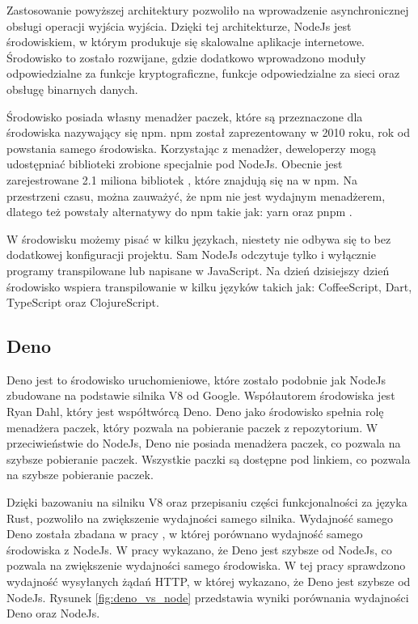 Zastosowanie powyższej architektury pozwoliło na wprowadzenie asynchronicznej obsługi operacji wyjścia wyjścia. Dzięki tej architekturze, NodeJs jest środowiskiem, w którym produkuje się skalowalne aplikacje internetowe. Środowisko to zostało rozwijane, gdzie dodatkowo wprowadzono moduły odpowiedzialne za funkcje kryptograficzne, funkcje odpowiedzialne za sieci oraz obsługę binarnych danych.

Środowisko posiada własny menadżer paczek, które są przeznaczone dla środowiska nazywający się npm. npm został zaprezentowany w 2010 roku, rok od powstania samego środowiska. Korzystając z menadżer, deweloperzy mogą udostępniać biblioteki zrobione specjalnie pod NodeJs. Obecnie jest zarejestrowane 2.1 miliona bibliotek \cite{npm}, które znajdują się na w npm. Na przestrzeni czasu, można zauważyć, że npm nie jest wydajnym menadżerem, dlatego też powstały alternatywy do npm takie jak: yarn \cite{yarn} oraz pnpm \cite{pnpm}. 

W środowisku możemy pisać w kilku językach, niestety nie odbywa się to bez dodatkowej konfiguracji projektu. Sam NodeJs odczytuje tylko i wyłącznie programy transpilowane lub napisane w JavaScript. Na dzień dzisiejszy dzień środowisko wspiera transpilowanie w kilku języków takich jak: CoffeeScript, Dart, TypeScript oraz ClojureScript.

\subsection{Deno}
Deno jest to środowisko uruchomieniowe, które zostało podobnie jak NodeJs zbudowane na podstawie silnika V8 od Google. Współautorem środowiska jest Ryan Dahl, który jest współtwórcą Deno. Deno jako środowisko spełnia rolę menadżera paczek, który pozwala na pobieranie paczek z repozytorium. W przeciwieństwie do NodeJs, Deno nie posiada menadżera paczek, co pozwala na szybsze pobieranie paczek. Wszystkie paczki są dostępne pod linkiem, co pozwala na szybsze pobieranie paczek.

Dzięki bazowaniu na silniku V8 oraz przepisaniu części funkcjonalności za języka Rust, pozwoliło na zwiększenie wydajności samego silnika. Wydajność samego Deno została zbadana w pracy \cite{deno_performance}, w której porównano wydajność samego środowiska z NodeJs. W pracy wykazano, że Deno jest szybsze od NodeJs, co pozwala na zwiększenie wydajności samego środowiska. W tej pracy sprawdzono wydajność wysyłanych żądań HTTP, w której wykazano, że Deno jest szybsze od NodeJs. Rysunek \ref{fig:deno_vs_node} przedstawia wyniki porównania wydajności Deno oraz NodeJs.

